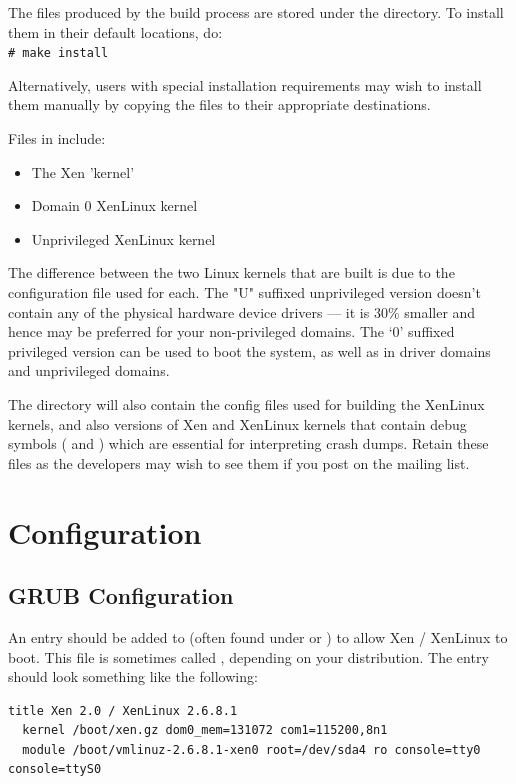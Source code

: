 \documentclass[11pt,twoside,final,openright]{xenstyle}
\begin{document}
The files produced by the build process are stored under the
 directory.  To install them in their default
locations, do: \\
\verb_# make install_

Alternatively, users with special installation requirements may wish
to install them manually by copying the files to their appropriate
destinations.

Files in  include:
\begin{itemize}
\item {} The Xen 'kernel'
\item {}  Domain 0 XenLinux kernel
\item {}  Unprivileged XenLinux kernel
\end{itemize}

The difference between the two Linux kernels that are built is due to
the configuration file used for each.  The "U" suffixed unprivileged
version doesn't contain any of the physical hardware device drivers
--- it is 30\% smaller and hence may be preferred for your
non-privileged domains.  The `0' suffixed privileged version can be
used to boot the system, as well as in driver domains and unprivileged
domains.

The  directory will also contain the config files
used for building the XenLinux kernels, and also versions of Xen and
XenLinux kernels that contain debug symbols ( and
) which are essential for interpreting crash
dumps.  Retain these files as the developers may wish to see them if
you post on the mailing list.

\section{Configuration}

\subsection{GRUB Configuration}

An entry should be added to  (often found under
 or ) to allow Xen / XenLinux to boot.
This file is sometimes called , depending on your
distribution.  The entry should look something like the following:

\begin{verbatim}
title Xen 2.0 / XenLinux 2.6.8.1
  kernel /boot/xen.gz dom0_mem=131072 com1=115200,8n1
  module /boot/vmlinuz-2.6.8.1-xen0 root=/dev/sda4 ro console=tty0 console=ttyS0
\end{verbatim}
\end{document}
